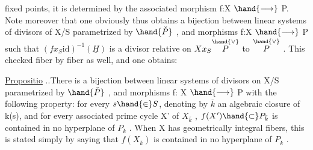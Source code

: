 
fixed points, it is  determined by the associated morphism f:X $\hand{\longrightarrow}$ P.
Note moreover that one obviously thus obtains a bijection
between linear systems of divisors of X/S parametrized
by $\hand{\check{P}}$ , and morphisms f:X $\hand{\longrightarrow}$ P such that $(fx_S\mathrm{id})^{-1}(\underline{H})$ is a
 divisor  relative on $Xx_S\overset{\hand{\vee}}{P}$ to $\overset{\hand{\vee}}{P}$ . This  
 checked fiber by fiber as well, and one obtains:

\uline{Propositio} ..There is a bijection between 
linear systems  of divisors on X/S parametrized by $\hand{\check{P}}$ , and morphisms
f: X $\hand{\longrightarrow}$ P with the following property: for every $s\hand{\in} S$, denoting
by $\bar{k}$ an algebraic closure of k(s), and for every associated prime cycle
X' of $X_{\bar{k}}$ , $f(X')\hand{\subset} P_{\bar{k}}$ is contained in no hyperplane of $P_{\bar{k}}$ .
\hand{(}When X has geometrically integral fibers, this 
 is stated simply by saying that $f(X_{\bar{k}})$ is contained in no
hyperplane of $P_{\bar{k}}$ \hand{)}.

